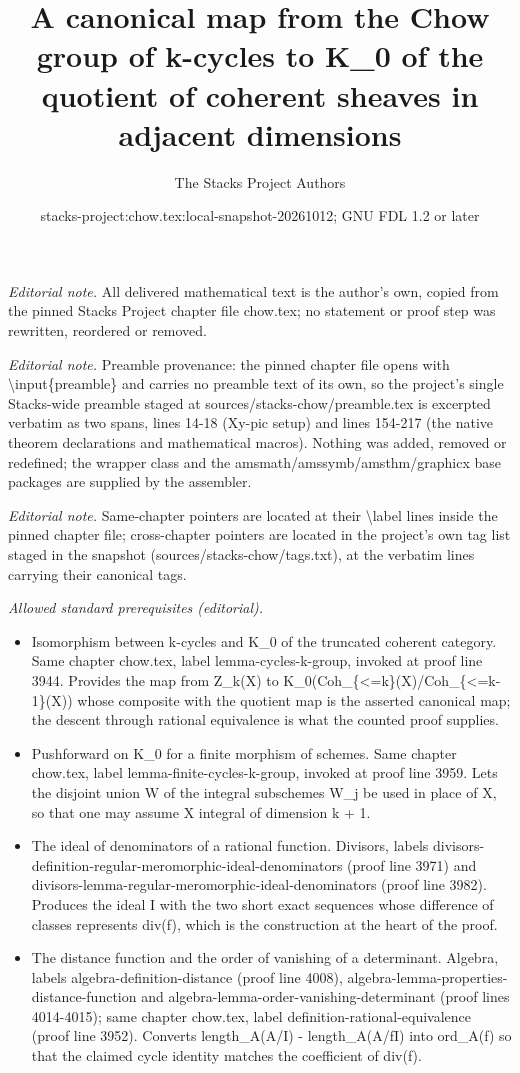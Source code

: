 \documentclass[10pt,a4paper]{amsart}
\title{A canonical map from the Chow group of k-cycles to K\_0 of the quotient of coherent sheaves in adjacent dimensions}
\author{The Stacks Project Authors}
\date{stacks-project:chow.tex:local-snapshot-20261012; GNU FDL 1.2 or later}
\theoremstyle{plain}
\theoremstyle{definition}
\theoremstyle{remark}
\numberwithin{equation}{subsection}
\begin{document}
\maketitle
\noindent\textit{Editorial note.} All delivered mathematical text is the author's own, copied from the pinned Stacks Project chapter file chow.tex; no statement or proof step was rewritten, reordered or removed.\par\medskip
\noindent\textit{Editorial note.} Preamble provenance: the pinned chapter file opens with \textbackslash{}input\{preamble\} and carries no preamble text of its own, so the project's single Stacks-wide preamble staged at sources/stacks-chow/preamble.tex is excerpted verbatim as two spans, lines 14-18 (Xy-pic setup) and lines 154-217 (the native theorem declarations and mathematical macros). Nothing was added, removed or redefined; the wrapper class and the amsmath/amssymb/amsthm/graphicx base packages are supplied by the assembler.\par\medskip
\noindent\textit{Editorial note.} Same-chapter pointers are located at their \textbackslash{}label lines inside the pinned chapter file; cross-chapter pointers are located in the project's own tag list staged in the snapshot (sources/stacks-chow/tags.txt), at the verbatim lines carrying their canonical tags.\par\medskip
\noindent\textit{Allowed standard prerequisites (editorial).}\begin{itemize}
\item Isomorphism between k-cycles and K\_0 of the truncated coherent category. Same chapter chow.tex, label lemma-cycles-k-group, invoked at proof line 3944. Provides the map from Z\_k(X) to K\_0(Coh\_\{<=k\}(X)/Coh\_\{<=k-1\}(X)) whose composite with the quotient map is the asserted canonical map; the descent through rational equivalence is what the counted proof supplies.
\item Pushforward on K\_0 for a finite morphism of schemes. Same chapter chow.tex, label lemma-finite-cycles-k-group, invoked at proof line 3959. Lets the disjoint union W of the integral subschemes W\_j be used in place of X, so that one may assume X integral of dimension k + 1.
\item The ideal of denominators of a rational function. Divisors, labels divisors-definition-regular-meromorphic-ideal-denominators (proof line 3971) and divisors-lemma-regular-meromorphic-ideal-denominators (proof line 3982). Produces the ideal I with the two short exact sequences whose difference of classes represents div(f), which is the construction at the heart of the proof.
\item The distance function and the order of vanishing of a determinant. Algebra, labels algebra-definition-distance (proof line 4008), algebra-lemma-properties-distance-function and algebra-lemma-order-vanishing-determinant (proof lines 4014-4015); same chapter chow.tex, label definition-rational-equivalence (proof line 3952). Converts length\_A(A/I) - length\_A(A/fI) into ord\_A(f) so that the claimed cycle identity matches the coefficient of div(f).
\end{itemize}\medskip
\end{document}
